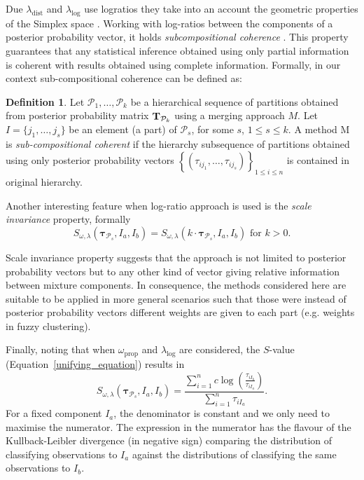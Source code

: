\documentclass[submit]{smj}
\theoremstyle{definition}
\newtheorem{defn}{Definition}[section]
\newcommand{\m}[1]{\boldsymbol{#1}}
\begin{document}
Due $\lambda_{\text{dist}}$ and $\lambda_{\log}$ use logratios they take into an account the geometric properties of the Simplex space \citep{aitchison2002simplicial}.  Working with log-ratios between the components of a posterior probability vector, it holds \emph{subcompositional coherence}  \citep{aitchison1986statistical}. This property guarantees that any statistical inference obtained using only partial information is coherent with results obtained using complete information. Formally, in our context sub-compositional coherence can be defined as:

\begin{defn}
Let $\mathcal{P}_1, \dots, \mathcal{P}_k$ be a hierarchical sequence of partitions obtained from posterior probability matrix $\text{\textbf{T}}_{\mathcal{P}_k}$ using a merging approach $M$. Let $I = \{j_1, \dots, j_s\}$ be an element (a part) of $\mathcal{P}_s$, for some $s$, $1\leq s \leq k$. A method M is \emph{sub-compositional coherent} if the hierarchy subsequence of partitions obtained  using only posterior probability vectors $\left\{ \left(\tau_{ij_1}, \dots, \tau_{ij_s} \right)\right\}_{1\leq i \leq n}$ is contained in original hierarchy.
\end{defn}

Another interesting feature when log-ratio approach is used is the \emph{scale invariance} property, formally
\[
S_{\omega, \lambda}( \m\tau_{\mathcal{P}_s},  I_a,  I_b) = S_{\omega, \lambda}(k\cdot \m\tau_{\mathcal{P}_s},  I_a,  I_b) \text{ for $k>0$.}
\] 

Scale invariance property suggests that the approach is not limited to posterior probability vectors but to any other kind of vector giving relative information between mixture components. In consequence, the methods considered here are suitable to be applied in more general scenarios such that those were instead of posterior probability vectors different weights are given to each part (e.g. weights in fuzzy clustering).

Finally, noting that when $\omega_{\text{prop}}$ and $\lambda_{\log}$ are considered, the $S$-value (Equation~\ref{unifying_equation}) results in
\[
S_{\omega, \lambda}( \m\tau_{\mathcal{P}_s},  I_a,  I_b) = \frac{\sum_{i=1}^nc  \log \left(\frac{ \tau_{iI_b} }{ \tau_{iI_a} }\right)}{\sum_{i=1}^n \tau_{iI_a}}.
\]
For a fixed component $I_a$, the denominator is constant and we only need to maximise the numerator. The expression in the numerator has the flavour of the Kullback-Leibler divergence (in negative sign) comparing the distribution of classifying observations to $I_a$ against the distributions of classifying the same observations to $I_b$.
\end{document}
